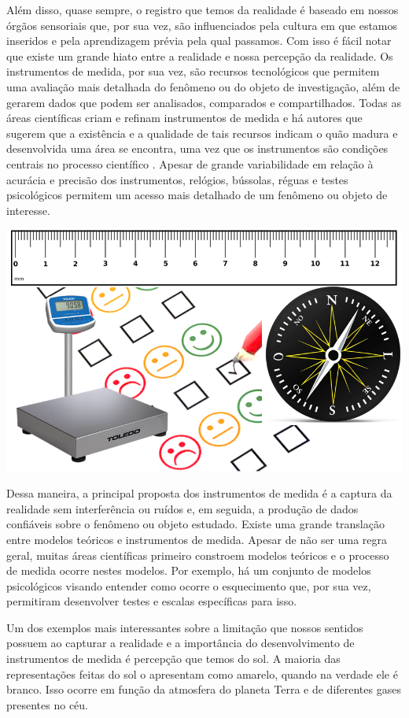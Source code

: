 \documentclass[
]{book}
\begin{document}
Além disso, quase sempre, o registro que temos da realidade é baseado em nossos órgãos sensoriais que, por sua vez, são influenciados pela cultura em que estamos inseridos e pela aprendizagem prévia pela qual passamos. Com isso é fácil notar que existe um grande hiato entre a realidade e nossa percepção da realidade. Os instrumentos de medida, por sua vez, são recursos tecnológicos que permitem uma avaliação mais detalhada do fenômeno ou do objeto de investigação, além de gerarem dados que podem ser analisados, comparados e compartilhados. Todas as áreas científicas criam e refinam instrumentos de medida e há autores que sugerem que a existência e a qualidade de tais recursos indicam o quão madura e desenvolvida uma área se encontra, uma vez que os instrumentos são condições centrais no processo científico \citep{Bergenholtz2018}. Apesar de grande variabilidade em relação à acurácia e precisão dos instrumentos, relógios, bússolas, réguas e testes psicológicos permitem um acesso mais detalhado de um fenômeno ou objeto de interesse.

\includegraphics{./img/cap_instrumentos.png}

Dessa maneira, a principal proposta dos instrumentos de medida é a captura da realidade sem interferência ou ruídos e, em seguida, a produção de dados confiáveis sobre o fenômeno ou objeto estudado. Existe uma grande translação entre modelos teóricos e instrumentos de medida. Apesar de não ser uma regra geral, muitas áreas científicas primeiro constroem modelos teóricos e o processo de medida ocorre nestes modelos. Por exemplo, há um conjunto de modelos psicológicos visando entender como ocorre o esquecimento que, por sua vez, permitiram desenvolver testes e escalas específicas para isso.

Um dos exemplos mais interessantes sobre a limitação que nossos sentidos possuem ao capturar a realidade e a importância do desenvolvimento de instrumentos de medida é percepção que temos do sol. A maioria das representações feitas do sol o apresentam como amarelo, quando na verdade ele é branco. Isso ocorre em função da atmosfera do planeta Terra e de diferentes gases presentes no céu.
\end{document}
